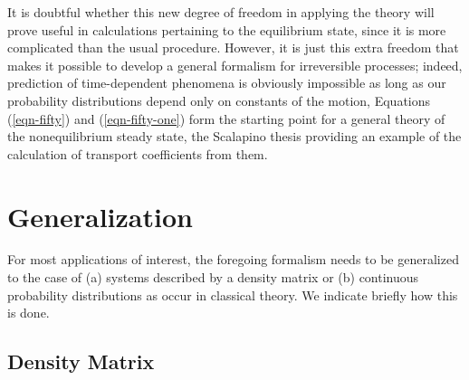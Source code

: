 \documentclass[]{article}
\begin{document}
\begin{enumerate}
It is doubtful whether this new degree of freedom in applying the theory will prove useful in calculations pertaining to the equilibrium state, since it is more complicated than the usual procedure. However, it is just this extra freedom that makes it possible to develop a general formalism for irreversible processes; indeed, prediction of time-dependent phenomena is obviously impossible as long as our probability distributions depend only on constants of the motion, Equations (\ref{eqn-fifty}) and (\ref{eqn-fifty-one}) form the starting point for a general theory of the nonequilibrium steady state, the Scalapino thesis providing an example of the calculation of transport coefficients from them.
\end{enumerate}

\section{Generalization}

For most applications of interest, the foregoing formalism needs to be generalized to the case of (a) systems described by a density matrix or (b) continuous probability distributions as occur in classical theory. We indicate briefly how this is done.

\subsection{Density Matrix}
\end{document}
